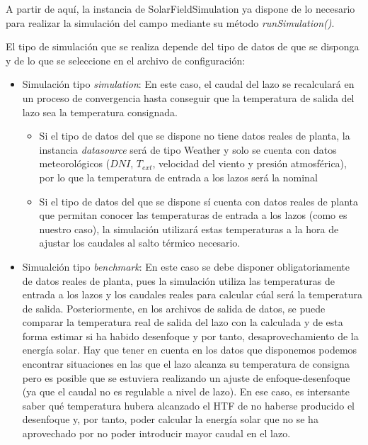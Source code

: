 \documentclass[11pt]{article}
\providecommand{\tightlist}{%
      \setlength{\itemsep}{0pt}\setlength{\parskip}{0pt}}
\begin{document}
A partir de aquí, la instancia de SolarFieldSimulation ya dispone de lo
necesario para realizar la simulación del campo mediante su método
\emph{runSimulation()}.

El tipo de simulación que se realiza depende del tipo de datos de que se
disponga y de lo que se seleccione en el archivo de configuración:

\begin{itemize}
\tightlist
\item
  Simulación tipo \emph{simulation}: En este caso, el caudal del lazo se
  recalculará en un proceso de convergencia hasta conseguir que la
  temperatura de salida del lazo sea la temperatura consignada.

  \begin{itemize}
  \tightlist
  \item
    Si el tipo de datos del que se dispone no tiene datos reales de
    planta, la instancia \emph{datasource} será de tipo Weather y solo
    se cuenta con datos meteorológicos (\(DNI\), \(T_{ext}\), velocidad
    del viento y presión atmosférica), por lo que la temperatura de
    entrada a los lazos será la nominal
  \item
    Si el tipo de datos del que se dispone sí cuenta con datos reales de
    planta que permitan conocer las temperaturas de entrada a los lazos
    (como es nuestro caso), la simulación utilizará estas temperaturas a
    la hora de ajustar los caudales al salto térmico necesario.
  \end{itemize}
\item
  Simualción tipo \emph{benchmark}: En este caso se debe disponer
  obligatoriamente de datos reales de planta, pues la simulación utiliza
  las temperaturas de entrada a los lazos y los caudales reales para
  calcular cúal será la temperatura de salida. Posteriormente, en los
  archivos de salida de datos, se puede comparar la temperatura real de
  salida del lazo con la calculada y de esta forma estimar si ha habido
  desenfoque y por tanto, desaprovechamiento de la energía solar. Hay
  que tener en cuenta en los datos que disponemos podemos encontrar
  situaciones en las que el lazo alcanza su temperatura de consigna pero
  es posible que se estuviera realizando un ajuste de enfoque-desenfoque
  (ya que el caudal no es regulable a nivel de lazo). En ese caso, es
  intersante saber qué temperatura hubera alcanzado el HTF de no haberse
  producido el desenfoque y, por tanto, poder calcular la energía solar
  que no se ha aprovechado por no poder introducir mayor caudal en el
  lazo.
\end{itemize}
\end{document}
